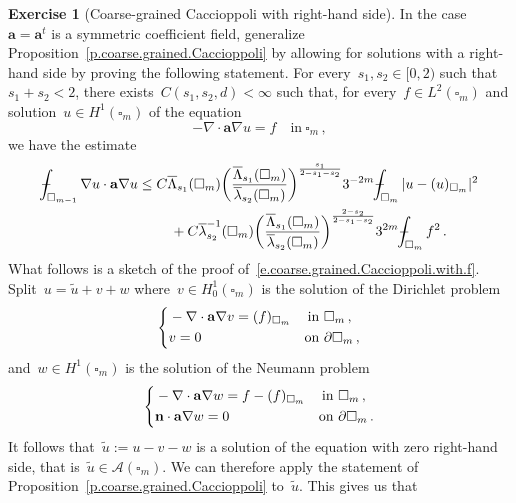\documentclass[11pt,twoside]{article} %
\let\oldsquare\square %
\renewcommand{\square}{\oldsquare}
\numberwithin{equation}{section}
\theoremstyle{definition}
\newtheorem{exercise}[theorem]{Exercise}
\let\originalleft\left
\let\originalright\right
\renewcommand{\left}{\mathopen{}\mathclose\bgroup\originalleft}
\renewcommand{\right}{\aftergroup\egroup\originalright}
\renewcommand*{\tilde}{\widetilde}
\renewcommand{\a}{\mathbf{a}}
\newcommand{\cu}{\square}
\def\Xint#1{\mathchoice
{\XXint\displaystyle\textstyle{#1}}%
{\XXint\textstyle\scriptstyle{#1}}%
{\XXint\scriptstyle\scriptscriptstyle{#1}}%
{\XXint\scriptscriptstyle\scriptscriptstyle{#1}}%
\!\int}
\def\XXint#1#2#3{{\setbox0=\hbox{$#1{#2#3}{\int}$}
\vcenter{\hbox{$#2#3$}}\kern-.5\wd0}}
\def\fint{\Xint-}
\newcommand{\A}{\mathcal{A}}
\begin{document}
\begin{exercise}[Coarse-grained Caccioppoli with right-hand side]
In the case~$\a = \a^t$ is a symmetric coefficient field, generalize Proposition~\ref{p.coarse.grained.Caccioppoli} by allowing for solutions with a right-hand side by proving the following statement. For every~$s_1,s_2\in [0,2)$ such that~$s_1+s_2 < 2$, there exists~$C(s_1,s_2,d)<\infty$ such that, for every~$f \in L^2(\cu_m)$ and solution~$u\in H^1(\cu_m)$ of the equation
\begin{equation}
\label{e.with.rhs.f}
-\nabla \cdot \a\nabla u = f 
\quad \mbox{in} \ 
\cu_m
\,,
\end{equation}
we have the estimate
\begin{align}
\label{e.coarse.grained.Caccioppoli.with.f}
\fint_{\cu_{m-1}} 
\nabla u \cdot \a\nabla u
&
\leq 
C \overline{\Lambda}_{s_1}(\cu_m) 
\biggl( \frac{\overline{\Lambda}_{s_1}(\cu_m)}{\overline{\lambda}_{s_2}(\cu_m)} \biggr)^{\frac{s_1}{2-s_1-s_2}}
3^{-2m}  \fint_{\cu_m}  | u-(u)_{\cu_m}|^2 
\notag \\ & \qquad  \
+
C
\overline{\lambda}^{-1}_{s_2} (\cu_m)
\biggl( \frac{\overline{\Lambda}_{s_1}(\cu_m)}{\overline{\lambda}_{s_2}(\cu_m)} \biggr)^{\frac{2-s_2}{2-s_1-s_2}}
3^{2m}  \fint_{\cu_m} f^2 
\,.
\end{align}
What follows is a sketch of the proof of~\eqref{e.coarse.grained.Caccioppoli.with.f}. 
Split~$u=\tilde{u} + v + w$ where~$v\in H^1_0(\cu_m)$ is the solution of the Dirichlet problem 
\begin{equation*}
\left\{
\begin{aligned}
& -\nabla \cdot \a\nabla v = (f)_{\cu_m}  & \mbox{in} & \ \cu_m\,, 
\\ 
& 
v = 0 & \mbox{on} & \ \partial \cu_m\,,
\end{aligned}
\right.
\end{equation*}
and~$w\in H^1(\cu_m)$ is the solution of the Neumann problem 
\begin{equation*}
\left\{
\begin{aligned}
& -\nabla \cdot \a\nabla w = f - (f)_{\cu_m}  & \mbox{in} & \ \cu_m\,, 
\\ 
& 
\mathbf{n} \cdot \a\nabla w = 0 & \mbox{on} & \ \partial \cu_m\,.
\end{aligned}
\right.
\end{equation*}
It follows that~$\tilde{u}:= u -v - w$ is a solution of the equation with zero right-hand side, that is~$\tilde{u} \in \A(\cu_m)$. We can therefore apply the statement of Proposition~\ref{p.coarse.grained.Caccioppoli} to~$\tilde{u}$. This gives us that 

\end{exercise}
\end{document}
